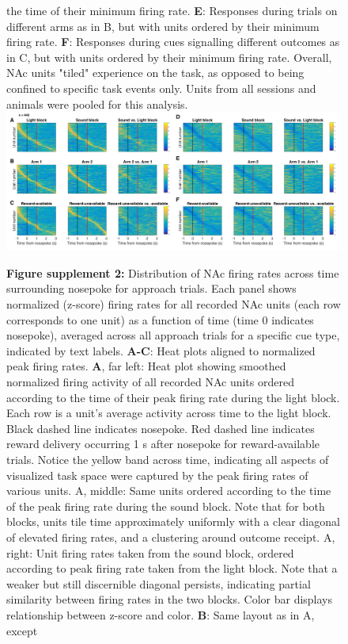 \documentclass[11pt]{article}
\newcommand{\bsf}[1]{\textbf{#1}}
\providecommand{\DIFaddbeginFL}{} %
\providecommand{\DIFdelendFL}{} %
\newcommand{\DIFaddincludegraphics}[2][]{{\color{red}\fbox{\DIFOincludegraphics[#1]{#2}}}} %
\DeclareRobustCommand{\DIFaddbeginFL}{\DIFOaddbeginFL \let\includegraphics\DIFaddincludegraphics} %
\DeclareRobustCommand{\DIFdelendFL}{\DIFOaddendFL \let\includegraphics\DIFOincludegraphics} %
\begin{document}
\begin{figure}[ht!]
{{the time of their minimum firing rate. \bsf{E}: Responses during trials on different arms as in B, but with units ordered by their minimum
firing rate. \bsf{F}: Responses during cues signalling different outcomes as in C, but with units ordered by their minimum firing
rate. Overall, NAc units "tiled" experience on the task, as opposed to being
confined to specific task events only. Units from all sessions and animals
were pooled for this analysis.}}
\DIFdelendFL \DIFaddbeginFL \includegraphics[width=\textwidth]{Fig 8 - SUPP NP Task tiling.pdf}
\caption*{\bsf{Figure supplement 2:} Distribution of NAc firing rates across time surrounding nosepoke for approach
trials. Each panel shows normalized (z-score) firing rates for all recorded NAc units
(each row corresponds to one unit) as a function of time (time 0 indicates
nosepoke), averaged across all approach trials for a specific cue type,
indicated by text labels. \bsf{A-C}: Heat plots aligned to normalized peak firing rates. \bsf{A}, far left: Heat plot showing smoothed
normalized firing activity of all recorded NAc units ordered according to the
time of their peak firing rate during the light block. Each row is a unit’s
average activity across time to the light block. Black dashed line indicates
nosepoke. Red dashed line indicates reward delivery occurring 1 s after
nosepoke for reward-available trials. Notice the yellow band across time,
indicating all aspects of visualized task space were captured by the peak
firing rates of various units. A, middle: Same units ordered according to
the time of the peak firing rate during the sound block. Note that for both
blocks, units tile time approximately uniformly with a clear diagonal of
elevated firing rates, and a clustering around outcome receipt. A, right: Unit firing rates taken from the sound block, ordered according to peak
firing rate taken from the light block. Note that a weaker but still
discernible diagonal persists, indicating partial similarity between firing
rates in the two blocks. Color bar displays relationship between z-score and color. \bsf{B}: Same layout as in A, except
}
\end{figure}
\end{document}
